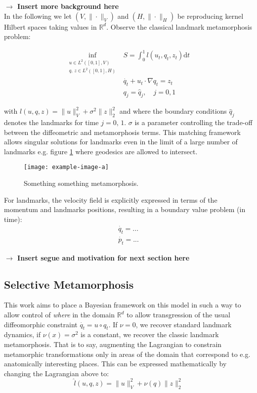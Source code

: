 \documentclass{article}
\newcommand{\norm}[2]{\| #1 \|_{ #2 }}
\newcommand{\vnorm}[1]{\norm{ #1 }{V}}
\newcommand{\hnorm}[1]{\norm{ #1 }{H}}
\newcommand{\ltwonorm}[1]{\norm{ #1 }{2}}
\newcommand{\diff}[1]{\text{d} #1}
\newcommand{\Rd}{\mathbb{R}^{d}}
\begin{document}
\textbf{$\longrightarrow$ Insert more background here}\\

In the following we let $(V,\vnorm{\cdot})$ and $(H,\hnorm{\cdot})$ be
reproducing kernel Hilbert spaces taking values in $\Rd$. Observe the classical
landmark metamorphosis problem: 

\begin{subequations}
\begin{align}
\inf_{\substack{u\in L^2([0,1],V)\\q,\, z \in L^2([0,1],H)}} & S = \int_0^1
l(u_t, q_t, z_t)\diff{t}\\
    & \dot{q_t} + u_t \cdot \nabla q_t = z_t \\
    & q_j = \hat q_j, \quad j=0,1
\end{align}
\end{subequations}

with $l(u, q, z) = \vnorm{u}^2 + \sigma^2\ltwonorm{z}^2$ and where the boundary
conditions $\hat q_j$ denotes the landmarks for time $j=0,\,1$. $\sigma$
is a parameter controlling the trade-off between the diffeometric and
metamorphosis terms. This matching framework allows singular solutions for
landmarks even in the limit of a large number of landmarks e.g. figure
\ref{fig:classic_mm} where geodesics are allowed to intersect.

\begin{figure}
  \centering
  \texttt{[image: example-image-a]}
  \caption{Something something metamorphosis.}
  \label{fig:classic_mm}
\end{figure}

For landmarks, the velocity field is explicitly expressed in terms of the
momentum and landmarks positions, resulting in a boundary value problem (in
time):
\begin{subequations}
\begin{align}
\dot{q_t} = ...\\
\dot{p_t} = ...
\end{align}
\end{subequations}

\textbf{$\longrightarrow$ Insert segue and motivation for next section here}

\subsection{Selective Metamorphosis}\label{sec:select_mm}

This work aims to place a Bayesian framework on this model in such a way to
allow control of \emph{where} in the domain $\Rd$ to allow transgression of the
usual diffeomorphic constraint $\dot{q_t} = u\circ q_t$. If $\nu=0$, we recover
standard landmark dynamics, if $\nu(x)=\sigma^2$ is a constant, we recover the
classic landmark metamorphosis. That is to say, augmenting the Lagrangian to
constrain metamorphic transformations only in areas of the domain that
correspond to e.g. anatomically interesting places.  This can be expressed
mathematically by changing the Lagrangian above to:
\[
\hat l(u, q, z) = \vnorm{u}^2 +  \nu(q)\ltwonorm{z}^2
\]
\end{document}
